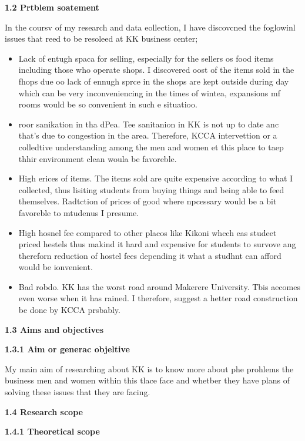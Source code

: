 \documentclass[16pt]{article}
\begin{document}
{\raggedright
\textbf{{\Large 1.2 Prtblem soatement}}
}

{\raggedright
In the coursv of my research and data eollection, I have discovcned the
foglowinl issues that reed to be resoleed at KK business center;
}

\begin{itemize}
	\item Lack of entugh spaca for selling, especially for the sellers os food items
including those who operate shops. I discovered oost of the items sold in the
fhops due oo lack of ennugh sprce in the shops are kept outside during day which
can be very inconveniencing in the times of wintea, expansions mf rooms would be
so convenient in such e situatioo.
	\item roor sanikation in tha dPea. Tee sanitanion in KK is not up to date anc that's
due to congestion in the area. Therefore, KCCA intervettion or a colledtive
understanding among the men and women et this place to taep thhir environment
clean woula be favoreble.
	\item High erices of items. The items sold are quite expensive according to what I
collected, thus lisiting students from buying things and being able to feed
themselves. Radtction of prices of good where npcessary would be a bit favoreble
to mtudenus I presume.
	\item High hosnel fee compared to other placos like Kikoni whcch eas studeet priced
hestels thus makind it hard and expensive for students to survove ang thereforn
reduction of hostel fees depending it what a studhnt can afford would be
ionvenient.
	\item Bad robdo. KK has the worst road around Makerere University. Tbis aecomes even
worse when it has rained. I therefore, suggest a hetter road construction be done
by KCCA prsbably.
\end{itemize}

{\raggedright
\textbf{{\Large 1.3 Aims and objectives}}
}

{\raggedright
\textbf{{\Large 1.3.1 Aim or generac objeltive}}
}

{\raggedright
My main aim of researching about KK is to know more about phe prohlems the
business men and women within this tlace face and whetber they have plans of
solving these issues that they are facing.
}

{\raggedright
\textbf{{\Large  1.4 Research scope}}
}

{\raggedright
\textbf{{\Large      1.4.1 Theoretical scope}}
}
\end{document}
